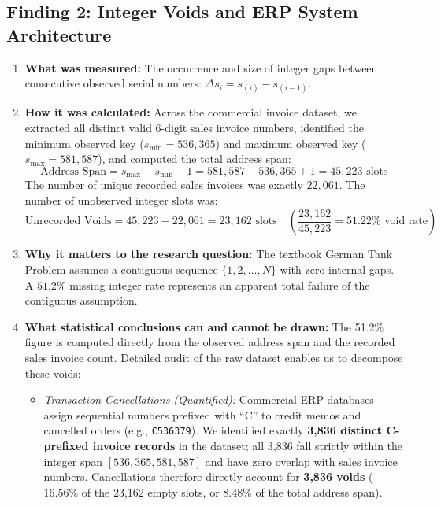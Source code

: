 \documentclass[10pt,a4paper]{article}
\begin{document}
\subsection{Finding 2: Integer Voids and ERP System Architecture}
\begin{enumerate}
    \item \textbf{What was measured:} The occurrence and size of integer gaps between consecutive observed serial numbers: $\Delta s_i = s_{(i)} - s_{(i-1)}$.
    \item \textbf{How it was calculated:} Across the commercial invoice dataset, we extracted all distinct valid 6-digit sales invoice numbers, identified the minimum observed key ($s_{\min} = 536,365$) and maximum observed key ($s_{\max} = 581,587$), and computed the total address span:
    \begin{equation}
    \text{Address Span} = s_{\max} - s_{\min} + 1 = 581,587 - 536,365 + 1 = 45,223 \text{ slots}
    \end{equation}
    The number of unique recorded sales invoices was exactly $22,061$. The number of unobserved integer slots was:
    \begin{equation}
    \text{Unrecorded Voids} = 45,223 - 22,061 = 23,162 \text{ slots} \quad \left( \frac{23,162}{45,223} = 51.22\% \text{ void rate} \right)
    \end{equation}
    \item \textbf{Why it matters to the research question:} The textbook German Tank Problem assumes a contiguous sequence $\{1, 2, \dots, N\}$ with zero internal gaps. A $51.2\%$ missing integer rate represents an apparent total failure of the contiguous assumption.
    \item \textbf{What statistical conclusions can and cannot be drawn:} The 51.2\% figure is computed directly from the observed address span and the recorded sales invoice count. Detailed audit of the raw dataset enables us to decompose these voids:
    \begin{itemize}
        \item \textit{Transaction Cancellations (Quantified):} Commercial ERP databases assign sequential numbers prefixed with ``C'' to credit memos and cancelled orders (e.g., \texttt{C536379}). We identified exactly \textbf{3,836 distinct C-prefixed invoice records} in the dataset; all 3,836 fall strictly within the integer span $[536,365, 581,587]$ and have zero overlap with sales invoice numbers. Cancellations therefore directly account for \textbf{3,836 voids} ($16.56\%$ of the 23,162 empty slots, or $8.48\%$ of the total address span).

\end{itemize}
\end{enumerate}
\end{document}
